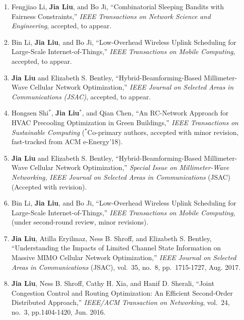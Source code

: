 \documentclass[overlapped,line,letterpaper]{res1}
\begin{document}
\begin{resume}
\begin{enumerate}
\vspace*{.08in} \item Fengjiao Li, {\bf Jia Liu}, and Bo Ji, ``Combinatorial Sleeping Bandits with Fairness Constraints,'' {\em IEEE Transactions on Network Science and Engineering}, accepted, to appear.

\vspace*{.08in} \item Bin Li, {\bf Jia Liu}, and Bo Ji, ``Low-Overhead Wireless Uplink Scheduling for Large-Scale Internet-of-Things,'' {\em IEEE Transactions on Mobile Computing}, accepted, to appear.

\vspace*{.08in} \item {\bf Jia Liu} and Elizabeth S. Bentley, ``Hybrid-Beamforming-Based Millimeter-Wave Cellular Network Optimization,'' {\em IEEE Journal on Selected Areas in Communications (JSAC)}, accepted, to appear.

\vspace*{.08in} \item Hongsen Shi$^{*}$, \textbf{Jia Liu}$^{*}$, and Qian Chen, ``An RC-Network Approach for HVAC Precooling Optimization in Green Buildings,'' {\em IEEE Transactions on Sustainable Computing} ($^{*}$Co-primary authors, accepted with minor revision, fast-tracked from ACM e-Energy'18).

\vspace*{.08in} \item \textbf{Jia Liu} and Elizabeth S. Bentley, ``Hybrid-Beamforming-Based Millimeter-Wave Cellular Network Optimization,'' {\em Special Issue on Millimeter-Wave Networking, IEEE Journal on Selected Areas in Communications} (JSAC) (Accepted with revision).

\vspace*{.08in} \item Bin Li, \textbf{Jia Liu}, and Bo Ji, ``Low-Overhead Wireless Uplink Scheduling for Large-Scale Internet-of-Things,'' {\em IEEE Transactions on Mobile Computing}, (under second-round review, minor revisions).

\vspace*{.08in} \item \textbf{Jia Liu}, Atilla Eryilmaz, Ness B. Shroff, and Elizabeth S. Bentley, ``Understanding the Impacts of Limited Channel State Information on Massive MIMO Cellular Network Optimization,'' {\em IEEE Journal on Selected Areas in Communications} (JSAC), vol.~35, no.~8, pp.~1715-1727, Aug. 2017.

\vspace {.08in} \item \textbf{Jia Liu}, Ness B. Shroff, Cathy H. Xia, and Hanif D. Sherali, ``Joint Congestion Control and Routing Optimization: An Efficient Second-Order Distributed Approach,'' {\em IEEE/ACM Transaction on Networking}, vol.~24, no.~3, pp.1404-1420, Jun. 2016.


\end{enumerate}
\end{resume}
\end{document}
